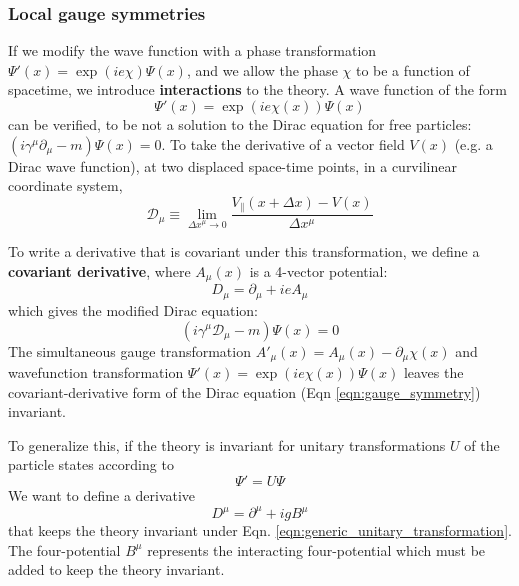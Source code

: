 \documentclass{article}
\begin{document}
\subsubsection{Local gauge symmetries}
If we modify the wave function with a phase transformation $\Psi'(x) = \exp(i e \chi) \Psi(x)$, and we allow the phase $\chi$ to be a function of spacetime, we introduce \textbf{interactions} to the theory. A wave function of the form
\begin{equation}
    \Psi'(x) = \exp(i e \chi(x)) \Psi(x)
\end{equation}
can be verified, to be not a solution to the Dirac equation for free particles: $(i \gamma^\mu \partial_\mu - m) \Psi(x) = 0$. To take the derivative of a vector field $V(x)$ (e.g. a Dirac wave function), at two displaced space-time points, in a curvilinear coordinate system, 
\begin{equation}
    \mathcal{D}_\mu \equiv \lim_{\Delta x^\mu \rightarrow 0} \frac{V_{\parallel}(x + \Delta x) - V(x)}
{\Delta x^\mu}\end{equation}

To write a derivative that is covariant under this transformation, we define a \textbf{covariant derivative}, where $A_\mu(x)$ is a 4-vector potential:
\begin{equation}
    D_\mu = \partial_\mu + i e A_\mu
\label{eqn:modified_dirac}
\end{equation}
which gives the modified Dirac equation:
\begin{equation}
    \left( i \gamma^\mu \mathcal{D}_\mu - m  \right) \Psi(x) = 0
\end{equation}
The simultaneous gauge transformation $A'_\mu(x) = A_\mu(x) - \partial_\mu\chi(x)$ and wavefunction transformation $\Psi'(x) = \exp(ie\chi(x)) \Psi(x)$ leaves the covariant-derivative form of the Dirac equation (Eqn \ref{eqn:gauge_symmetry}) invariant.

To generalize this, if the theory is invariant for unitary transformations $U$ of the particle states according to 
\begin{equation}
    \Psi' = U\Psi
\label{eqn:generic_unitary_transformation}
\end{equation}
We want to define a derivative
\begin{equation}
    D^\mu = \partial^\mu + ig B^\mu
\end{equation}
that keeps the theory invariant under Eqn. \ref{eqn:generic_unitary_transformation}. The four-potential $B^\mu$ represents the interacting four-potential which must be added to keep the theory invariant.
\end{document}
